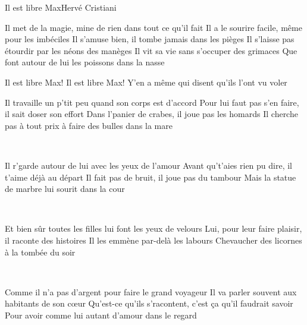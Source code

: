 \documentclass[a4paper,11pt,french]{article}
\begin{document}
\begin{Song}{Il est libre Max}{Hervé Cristiani}

\begin{Verse}
Il met de la magie, mine de rien dans tout ce qu'il fait
Il a le sourire facile, même pour les imbéciles
Il s'amuse bien, il tombe jamais dans les pièges
Il s'laisse pas étourdir par les néons des manèges
Il vit sa vie sans s'occuper des grimaces
Que font autour de lui les poissons dans la nasse
\end{Verse}
\espaceInterStrophe

\begin{Chorus}
Il est libre Max! Il est libre Max!
Y'en a même qui disent qu'ils l'ont vu voler
\end{Chorus}
\espaceInterStrophe

\begin{Verse}
Il travaille un p'tit peu quand son corps est d'accord
Pour lui faut pas s'en faire, il sait doser son effort
Dans l'panier de crabes, il joue pas les homards
Il cherche pas à tout prix à faire des bulles dans la mare
\end{Verse}
\espaceInterStrophe

\aurefrain\\
\espaceInterStrophe

\begin{Verse}
Il r'garde autour de lui avec les yeux de l'amour
Avant qu't'aies rien pu dire, il t'aime déjà au départ
Il fait pas de bruit, il joue pas du tambour
Mais la statue de marbre lui sourit dans la cour
\end{Verse}
\espaceInterStrophe

\aurefrain\\
\espaceInterStrophe

\begin{Verse}
Et bien sûr toutes les filles lui font les yeux de velours
Lui, pour leur faire plaisir, il raconte des histoires
Il les emmène par-delà les labours
Chevaucher des licornes à la tombée du soir
\end{Verse}
\espaceInterStrophe

\aurefrain\\
\espaceInterStrophe

\begin{Verse}
Comme il n'a pas d'argent pour faire le grand voyageur
Il va parler souvent aux habitants de son cœur
Qu'est-ce qu'ils s'racontent, c'est ça qu'il faudrait savoir
Pour avoir comme lui autant d'amour dans le regard
\end{Verse}
\espaceInterStrophe


\end{Song}
\end{document}
